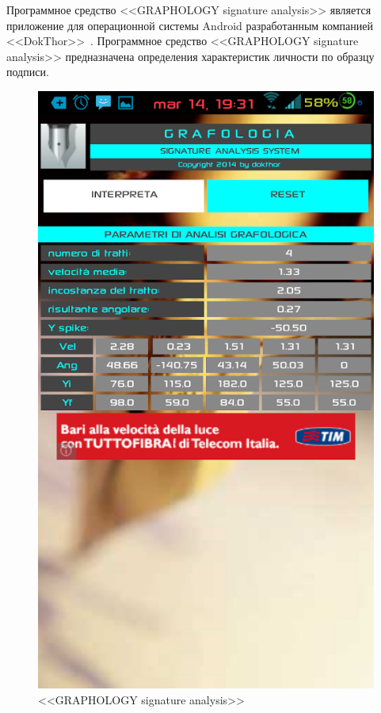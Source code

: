 Программное средство <<GRAPHOLOGY signature analysis>> является приложение для операционной системы Android разработанным компанией <<DokThor>>~\cite{analogs_graphology_sign_analysis}. Программное средство <<GRAPHOLOGY signature analysis>> предназначена определения характеристик личности по образцу подписи.

\begin{figure}[h]
    \centering
    \label{fig:domain:analog:graphology_sign_analysis}
    \includegraphics[height=0.5\textheight]{figures/analog_graphology_sign_analysis.png}
    \caption{<<GRAPHOLOGY signature analysis>>}
\end{figure}

